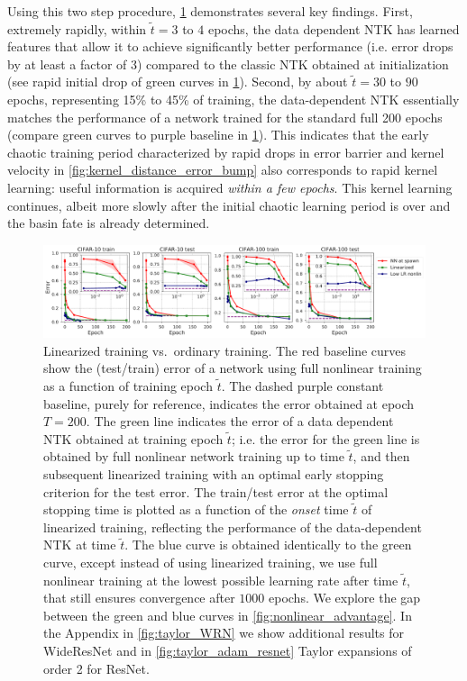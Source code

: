 \documentclass{article}
\begin{document}
Using this two step procedure, \cref{fig:taylorized_network_training_accuracies} demonstrates several key findings.  First, extremely rapidly, within $\tilde t = 3$ to $4$ epochs, the data dependent NTK has learned features that allow it to achieve significantly better performance (i.e. error drops by at least a factor of 3) compared to  the classic NTK obtained at initialization (see rapid initial drop of green curves in \cref{fig:taylorized_network_training_accuracies}). Second, by about $\tilde t = 30$ to $90$ epochs, representing 15\% to 45\% of training, the data-dependent NTK essentially matches the performance of a network trained for the standard full 200 epochs (compare green curves to purple baseline in \cref{fig:taylorized_network_training_accuracies}). 
This indicates that the early chaotic training period characterized by rapid drops in error barrier and kernel velocity in \cref{fig:kernel_distance_error_bump} also corresponds to rapid kernel learning: useful information is acquired {\it within a few epochs}. This kernel learning continues, albeit more slowly after the initial chaotic learning period is over and the basin fate is already determined.   


\begin{figure}[h]
\centering
\includegraphics[width=1.0\linewidth]{figures/4panel_JAX_BN_ResNet20v1_taylorized_training_accuracies_axes_lin-lin_84529098.pdf}
\caption{Linearized training vs.\ ordinary training.  
The red baseline curves show the (test/train) error of a network using full nonlinear training as a function of training epoch $\tilde t$. The dashed purple constant baseline, purely for reference, indicates the error obtained at epoch $T=200$.  The green line indicates the error of a data dependent NTK obtained at training epoch $\tilde t$; i.e. the error for the green line is obtained by full nonlinear network training up to time $\tilde t$, and then subsequent linearized training with an optimal early stopping criterion for the test error. The train/test error at the optimal stopping time is plotted as a function of the {\it onset} time $\tilde t$ of linearized training, reflecting the performance of the data-dependent NTK at time $\tilde t$.   The blue curve is obtained identically to the green curve, except instead of using linearized training, we use full nonlinear training at the lowest possible learning rate after time $\tilde t$, that still ensures convergence after $1000$ epochs.  We explore the gap between the green and blue curves in \cref{fig:nonlinear_advantage}. In the Appendix in \cref{fig:taylor_WRN} we show additional results for WideResNet and in \cref{fig:taylor_adam_resnet} Taylor expansions of order 2 for ResNet.} 
\label{fig:taylorized_network_training_accuracies}
\end{figure}
\end{document}
